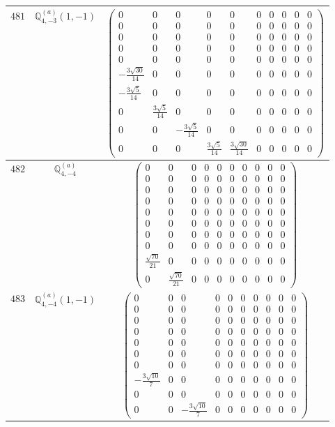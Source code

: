 \documentclass[fleqn,8pt,landscape]{jsarticle}
\begin{document}
\begin{center}
\begin{longtable}{ccc}
$ 481 $ & $ \mathbb{Q}_{4,-3}^{(a)}(1,-1) $ & $ \begin{pmatrix} 0 & 0 & 0 & 0 & 0 & 0 & 0 & 0 & 0 & 0 \\ 0 & 0 & 0 & 0 & 0 & 0 & 0 & 0 & 0 & 0 \\ 0 & 0 & 0 & 0 & 0 & 0 & 0 & 0 & 0 & 0 \\ 0 & 0 & 0 & 0 & 0 & 0 & 0 & 0 & 0 & 0 \\ 0 & 0 & 0 & 0 & 0 & 0 & 0 & 0 & 0 & 0 \\ - \frac{3 \sqrt{30}}{14} & 0 & 0 & 0 & 0 & 0 & 0 & 0 & 0 & 0 \\ - \frac{3 \sqrt{5}}{14} & 0 & 0 & 0 & 0 & 0 & 0 & 0 & 0 & 0 \\ 0 & \frac{3 \sqrt{5}}{14} & 0 & 0 & 0 & 0 & 0 & 0 & 0 & 0 \\ 0 & 0 & - \frac{3 \sqrt{5}}{14} & 0 & 0 & 0 & 0 & 0 & 0 & 0 \\ 0 & 0 & 0 & \frac{3 \sqrt{5}}{14} & \frac{3 \sqrt{30}}{14} & 0 & 0 & 0 & 0 & 0 \end{pmatrix} $ \\ \hline
$ 482 $ & $ \mathbb{Q}_{4,-4}^{(a)} $ & $ \begin{pmatrix} 0 & 0 & 0 & 0 & 0 & 0 & 0 & 0 & 0 & 0 \\ 0 & 0 & 0 & 0 & 0 & 0 & 0 & 0 & 0 & 0 \\ 0 & 0 & 0 & 0 & 0 & 0 & 0 & 0 & 0 & 0 \\ 0 & 0 & 0 & 0 & 0 & 0 & 0 & 0 & 0 & 0 \\ 0 & 0 & 0 & 0 & 0 & 0 & 0 & 0 & 0 & 0 \\ 0 & 0 & 0 & 0 & 0 & 0 & 0 & 0 & 0 & 0 \\ 0 & 0 & 0 & 0 & 0 & 0 & 0 & 0 & 0 & 0 \\ 0 & 0 & 0 & 0 & 0 & 0 & 0 & 0 & 0 & 0 \\ \frac{\sqrt{70}}{21} & 0 & 0 & 0 & 0 & 0 & 0 & 0 & 0 & 0 \\ 0 & \frac{\sqrt{70}}{21} & 0 & 0 & 0 & 0 & 0 & 0 & 0 & 0 \end{pmatrix} $ \\ \hline
$ 483 $ & $ \mathbb{Q}_{4,-4}^{(a)}(1,-1) $ & $ \begin{pmatrix} 0 & 0 & 0 & 0 & 0 & 0 & 0 & 0 & 0 & 0 \\ 0 & 0 & 0 & 0 & 0 & 0 & 0 & 0 & 0 & 0 \\ 0 & 0 & 0 & 0 & 0 & 0 & 0 & 0 & 0 & 0 \\ 0 & 0 & 0 & 0 & 0 & 0 & 0 & 0 & 0 & 0 \\ 0 & 0 & 0 & 0 & 0 & 0 & 0 & 0 & 0 & 0 \\ 0 & 0 & 0 & 0 & 0 & 0 & 0 & 0 & 0 & 0 \\ 0 & 0 & 0 & 0 & 0 & 0 & 0 & 0 & 0 & 0 \\ - \frac{3 \sqrt{10}}{7} & 0 & 0 & 0 & 0 & 0 & 0 & 0 & 0 & 0 \\ 0 & 0 & 0 & 0 & 0 & 0 & 0 & 0 & 0 & 0 \\ 0 & 0 & - \frac{3 \sqrt{10}}{7} & 0 & 0 & 0 & 0 & 0 & 0 & 0 \end{pmatrix} $ \\ \hline

\end{longtable}
\end{center}
\end{document}
